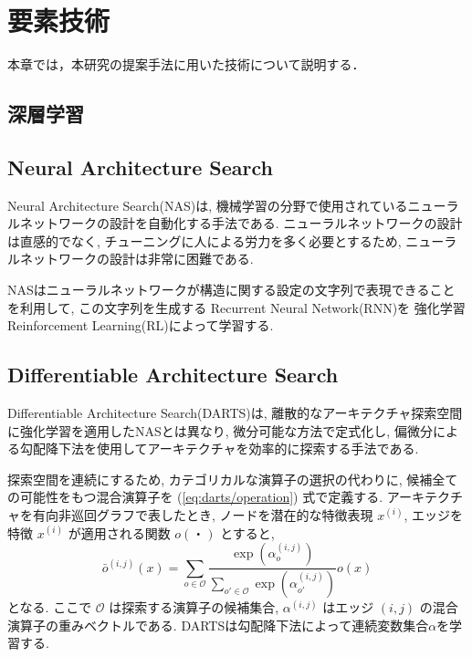 \newpage
\changeindent{0cm}
\section{要素技術}
\label{sec:tech}
\changeindent{2cm}

本章では，本研究の提案手法に用いた技術について説明する．

\changeindent{0cm}
\subsection{深層学習}
\changeindent{2cm}
\label{sec:02_deep}



\changeindent{0cm}
\subsection{Neural Architecture Search}
\changeindent{2cm}
\label{sec:02_nas}
Neural Architecture Search(NAS)\cite{DBLP:journals/corr/ZophL16}は,
機械学習の分野で使用されているニューラルネットワークの設計を自動化する手法である.
ニューラルネットワークの設計は直感的でなく,
チューニングに人による労力を多く必要とするため,
ニューラルネットワークの設計は非常に困難である.

NASはニューラルネットワークが構造に関する設定の文字列で表現できることを利用して,
この文字列を生成する
Recurrent Neural Network(RNN)を
強化学習 Reinforcement Learning(RL)によって学習する.



\changeindent{0cm}
\subsection{Differentiable Architecture Search}
\changeindent{2cm}
\label{sec:02_darts}

Differentiable Architecture Search(DARTS)\cite{DBLP:journals/corr/abs-1806-09055}は,
離散的なアーキテクチャ探索空間に強化学習を適用したNASとは異なり,
微分可能な方法で定式化し,
偏微分による勾配降下法を使用してアーキテクチャを効率的に探索する手法である.

探索空間を連続にするため, カテゴリカルな演算子の選択の代わりに, 候補全ての可能性をもつ混合演算子を
(\ref{eq:darts/operation}) 式で定義する.
アーキテクチャを有向非巡回グラフで表したとき, ノードを潜在的な特徴表現 $x^{(i)}$,
エッジを特徴 $x^{(i)}$ が適用される関数 $o(・)$ とすると,
\begin{equation}
  \label{eq:darts/operation}
  \bar{o}^{(i, j)}(x) = \sum_{o \in \mathcal{O}} \frac{\exp(\alpha^{(i, j)}_o)}{\sum_{o' \in \mathcal{O}} \exp(\alpha^{(i, j)}_{o'})} o(x)
\end{equation}
となる. ここで
$\mathcal{O}$ は探索する演算子の候補集合,
$\alpha^{(i, j)}$ はエッジ $(i, j)$ の混合演算子の重みベクトルである.
DARTSは勾配降下法によって連続変数集合$\alpha$を学習する.

